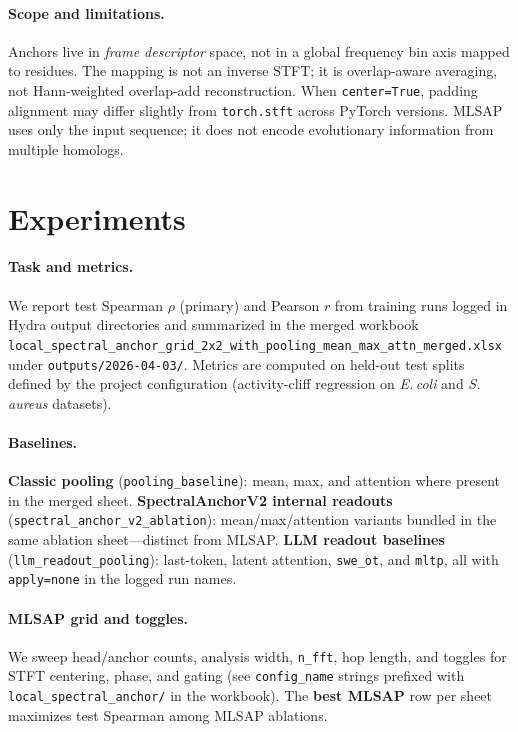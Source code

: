 \documentclass[11pt]{article}
\newcommand{\method}{MLSAP}
\begin{document}
\paragraph{Scope and limitations.}
Anchors live in \emph{frame descriptor} space, not in a global frequency bin axis mapped to residues.
The mapping is not an inverse STFT; it is overlap-aware averaging, not Hann-weighted overlap-add reconstruction.
When \texttt{center=True}, padding alignment may differ slightly from \texttt{torch.stft} across PyTorch versions.
\method{} uses only the input sequence; it does not encode evolutionary information from multiple homologs.

\section{Experiments}
\paragraph{Task and metrics.}
We report test Spearman $\rho$ (primary) and Pearson $r$ from training runs logged in Hydra output directories and summarized in the merged workbook \texttt{local\_spectral\_anchor\_grid\_2x2\_with\_pooling\_mean\_max\_attn\_merged.xlsx} under \texttt{outputs/2026-04-03/}.
Metrics are computed on held-out test splits defined by the project configuration (activity-cliff regression on \textit{E.\,coli} and \textit{S.\,aureus} datasets).

\paragraph{Baselines.}
\textbf{Classic pooling} (\texttt{pooling\_baseline}): mean, max, and attention where present in the merged sheet.
\textbf{SpectralAnchorV2 internal readouts} (\texttt{spectral\_anchor\_v2\_ablation}): mean/max/attention variants bundled in the same ablation sheet---distinct from \method{}.
\textbf{LLM readout baselines} (\texttt{llm\_readout\_pooling}): last-token, latent attention, \texttt{swe\_ot}, and \texttt{mltp}, all with \texttt{apply=none} in the logged run names.

\paragraph{MLSAP grid and toggles.}
We sweep head/anchor counts, analysis width, \texttt{n\_fft}, hop length, and toggles for STFT centering, phase, and gating (see \texttt{config\_name} strings prefixed with \texttt{local\_spectral\_anchor/} in the workbook).
The \textbf{best MLSAP} row per sheet maximizes test Spearman among \method{} ablations.
\end{document}
